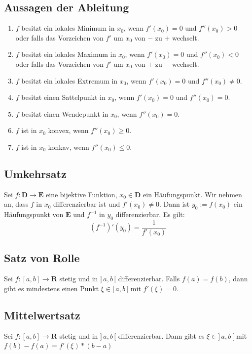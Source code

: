 \documentclass[8pt]{extarticle}
\begin{document}
\begin{multicols*}{3}
\subsection{Aussagen der Ableitung}
\begin{enumerate}
  \item $f$ besitzt ein lokales Minimum in $x_0$, wenn $f'(x_0) = 0$ und $f''(x_0) > 0$ oder falls das Vorzeichen von $f'$ um $x_0$ von $-$ zu $+$ wechselt.
  \item $f$ besitzt ein lokales Maximum in $x_0$, wenn $f'(x_0) = 0$ und $f''(x_0) < 0$ oder falls das Vorzeichen von $f'$ um $x_0$ von $+$ zu $-$ wechselt.
  \item $f$ besitzt ein lokales Extremum in $x_0$, wenn $f'(x_0) = 0$ und $f''(x_0) \ne 0$.
  \item $f$ besitzt einen Sattelpunkt in $x_0$, wenn $f'(x_0) = 0$ und $f''(x_0) = 0$.
  \item $f$ besitzt einen Wendepunkt in $x_0$, wenn $f''(x_0) = 0$.
  \item $f$ ist in $x_0$ konvex, wenn $f''(x_0) \ge 0$.
  \item $f$ ist in $x_0$ konkav, wenn $f''(x_0) \le 0$.
\end{enumerate}
\subsection{Umkehrsatz}

Sei $f: \mathbf{D} \rightarrow \mathbf{E}$ eine bijektive Funktion,
$x_0 \in \mathbf{D}$ ein Häufungspunkt. Wir
nehmen an, dass $f$ in $x_0$ differenzierbar ist und $f'(x_0) \neq 0$.
Dann ist $y_0 := f(x_0)$ ein Häufungspunkt von $\mathbf{E}$
und $f^{-1}$ in $y_0$ differenzierbar. Es gilt:
$$
  (f^{-1})'(y_0) = \frac{1}{f'(x_0)}
$$

\subsection{Satz von Rolle}

Sei $f:[a, b] \rightarrow \mathbf{R}$ stetig und in $]\,a, b\,[$ differenzierbar. Falls
$f(a) = f(b)$, dann gibt es mindestens einen Punkt $\xi \in ]\,a, b\,[$ mit $f'(\xi) = 0$.

\subsection{Mittelwertsatz}

Sei $f:[a, b] \rightarrow \mathbf{R}$ stetig und in $]\,a, b\,[$ differenzierbar. Dann
gibt es $\xi \in ]\,a, b\,[$ mit $f(b) - f(a) = f'(\xi) * (b-a)$


\end{multicols*}
\end{document}
